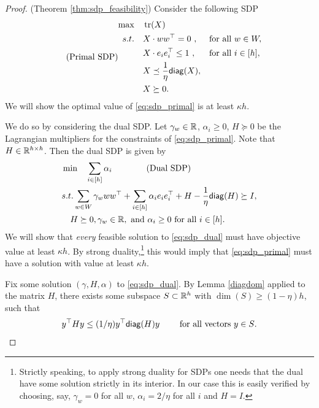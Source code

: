 \begin{proof}(Theorem \ref{thm:sdp_feasibility})
Consider the following SDP
\begin{equation}
\label{eq:sdp_primal} \tag{Primal SDP}
\begin{aligned}
    \max \quad & \operatorname{tr}(X) \\
    s.t. \quad & X \cdot ww^\top = 0 \ , && \text{for all } w \in W ,\\
    & X \cdot e_i e_i^\top \leq 1 \ , &&\text{for all } i \in [h] , \\
    & X \preceq \frac{1}{\eta} \mathsf{diag}(X) , \\
    & X \succeq 0 .
\end{aligned}
\end{equation}
We will show the optimal value of \eqref{eq:sdp_primal} is at least $\kappa h$.

\smallskip
\noindent 
We do so by considering the dual SDP. 
Let $\gamma_w \in \mathbb{R}$, $\alpha_i \geq 0$, $H \succeq 0$ be the Lagrangian multipliers for the constraints of \eqref{eq:sdp_primal}. 
Note that $H \in \mathbb{R}^{h\times h}$.
Then the dual SDP is given by 
\begin{align}
\label{eq:sdp_dual} 
& \min \quad \sum_{i \in [h]} \alpha_i   \qquad  \tag{Dual SDP} \\
& s.t. \sum_{w \in W} \gamma_w ww^\top + \sum_{i \in [h]} \alpha_i e_i e_i^\top + H - \frac{1}{\eta} \mathsf{diag}(H)  \succeq I, \label{eq:dual-sdp-komlos} \\
& \quad H \succeq 0, \gamma_w \in \mathbb{R}, \ \text{and } \alpha_i \geq 0 \text{ for all } i \in [h] .\nonumber 
\end{align}
We will show that {\em every} feasible solution to \eqref{eq:sdp_dual} must have objective value at least $\kappa h$.
By strong duality,\footnote{Strictly speaking, to apply strong duality for SDPs one needs that the dual have some solution strictly in its interior. In our case this is easily verified by choosing, say, $\gamma_w=0$ for all $w$, $\alpha_i=2/\eta$ for all $i$ and $H=I$.  } this would imply that \eqref{eq:sdp_primal} must have a solution with value at least $\kappa h$.

\medskip
{}
Fix some solution $(\gamma,H,\alpha)$ to \eqref{eq:sdp_dual}.
By Lemma \ref{diagdom} applied to the matrix $H$, there exists some subspace $S \subset \mathbb{R}^h$ with $\dim(S) \geq (1 - \eta) h$, such that \[y^\top H y \leq (1/\eta) y^\top \mathsf{diag}(H) y \qquad \text{ for all vectors $y \in S$}.\]


\end{proof}
